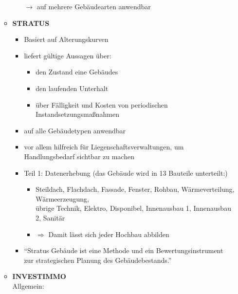 \documentclass[fleqn,twoside,dvipsnames]{article}
\begin{document}
\begin{itemize}
\begin{itemize}
\begin{itemize}
                                $\rightarrow$ auf mehrere Gebäudearten anwendbar
                        \end{itemize}
                    \item \textbf{STRATUS} \label{Stratus}
                        \begin{itemize}
                            \item Basiert auf Alterungskurven
                            \item liefert gültige Aussagen über:
                                \begin{itemize}
                                    \item den Zustand eine Gebäudes
                                    \item den laufenden Unterhalt
                                    \item über Fälligkeit und Kosten von periodischen Instandsetzungsmaßnahmen
                                \end{itemize}
                            \item auf alle Gebäudetypen anwendbar
                            \item vor allem hilfreich für Liegenschaftsverwaltungen, um Handlungsbedarf sichtbar zu machen
                            \item Teil 1: Datenerhebung (das Gebäude wird in 13 Bauteile unterteilt:)
                                \begin{itemize}
                                    \item Steildach, Flachdach, Fassade, Fenster, Rohbau, Wärmeverteilung, Wärmeerzeugung, \\übrige Technik, Elektro, Disponibel, Innenausbau 1, Innenausbau 2, Sanitär
                                    \item $\Rightarrow$ Damit lässt sich jeder Hochbau abbilden
                                \end{itemize}
                            \item \enquote{Stratus Gebäude ist eine Methode und ein Bewertungsinstrument zur strategischen Planung des Gebäudebestands.}
                        \end{itemize}
                    \item \textbf{INVESTIMMO}\\
                        Allgemein:
                            \begin{itemize}

\end{itemize}
\end{itemize}
\end{itemize}
\end{document}
